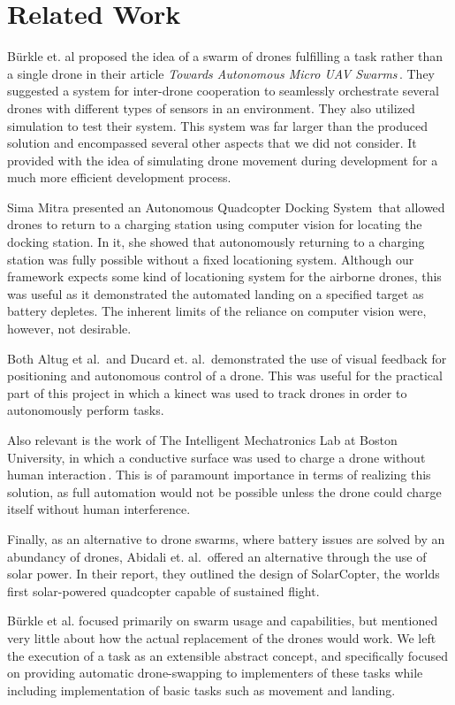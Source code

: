 \section{Related Work}
B\"urkle et. al proposed the idea of a swarm of drones fulfilling a task rather than a single drone in their article \textit{Towards Autonomous Micro UAV Swarms}\,\cite{burkleetal}. They suggested a system for inter-drone cooperation to seamlessly orchestrate several drones with different types of sensors in an environment. They also utilized simulation to test their system. This system was far larger than the produced solution and encompassed several other aspects that we did not consider. It provided with the idea of simulating drone movement during development for a much more efficient development process.

Sima Mitra presented an Autonomous Quadcopter Docking System\,\cite{simamitra} that allowed drones to return to a charging station using computer vision for locating the docking station. In it, she showed that autonomously returning to a charging station was fully possible without a fixed locationing system. Although our framework expects some kind of locationing system for the airborne drones, this was useful as it demonstrated the automated landing on a specified target as battery depletes. The inherent limits of the reliance on computer vision were, however, not desirable.

Both Altug et al.\,\cite{altugetal} and Ducard et. al.\,\cite{ducardetal} demonstrated the use of visual feedback for positioning and autonomous control of a drone. This was useful for the practical part of this project in which a kinect was used to track drones in order to autonomously perform tasks.

Also relevant is the work of The Intelligent Mechatronics Lab at Boston University, in which a conductive surface was used to charge a drone without human interaction\,\cite{bostonuni}. This is of paramount importance in terms of realizing this solution, as full automation would not be possible unless the drone could charge itself without human interference.

Finally, as an alternative to drone swarms, where battery issues are solved by an abundancy of drones, Abidali et. al.\,\cite{solarcopter} offered an alternative through the use of solar power. In their report, they outlined the design of SolarCopter, the worlds first solar-powered quadcopter capable of sustained flight.

B\"urkle et al. focused primarily on swarm usage and capabilities, but mentioned very little about how the actual replacement of the drones would work. We left the execution of a task as an extensible abstract concept, and specifically focused on providing automatic drone-swapping to implementers of these tasks while including implementation of basic tasks such as movement and landing.

